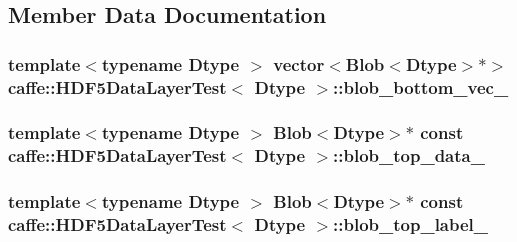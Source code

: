 \subsection{Member Data Documentation}
\hypertarget{classcaffe_1_1_h_d_f5_data_layer_test_a68f3f644d32f341c09cab346701df1e6}{
\subsubsection[{blob\+\_\+bottom\+\_\+vec\+\_\+}]{\setlength{\rightskip}{0pt plus 5cm}template$<$typename Dtype $>$ vector$<${\bf Blob}$<$Dtype$>$$\ast$$>$ {\bf caffe\+::\+H\+D\+F5\+Data\+Layer\+Test}$<$ Dtype $>$\+::blob\+\_\+bottom\+\_\+vec\+\_\+\hspace{0.3cm}{\ttfamily [protected]}}}\label{classcaffe_1_1_h_d_f5_data_layer_test_a68f3f644d32f341c09cab346701df1e6}
\hypertarget{classcaffe_1_1_h_d_f5_data_layer_test_a4e051fd65360f35354b864e33ae74eaa}{
\subsubsection[{blob\+\_\+top\+\_\+data\+\_\+}]{\setlength{\rightskip}{0pt plus 5cm}template$<$typename Dtype $>$ {\bf Blob}$<$Dtype$>$$\ast$ const {\bf caffe\+::\+H\+D\+F5\+Data\+Layer\+Test}$<$ Dtype $>$\+::blob\+\_\+top\+\_\+data\+\_\+\hspace{0.3cm}{\ttfamily [protected]}}}\label{classcaffe_1_1_h_d_f5_data_layer_test_a4e051fd65360f35354b864e33ae74eaa}
\hypertarget{classcaffe_1_1_h_d_f5_data_layer_test_afb89ea13ccf6f75de384f703c9444174}{
\subsubsection[{blob\+\_\+top\+\_\+label\+\_\+}]{\setlength{\rightskip}{0pt plus 5cm}template$<$typename Dtype $>$ {\bf Blob}$<$Dtype$>$$\ast$ const {\bf caffe\+::\+H\+D\+F5\+Data\+Layer\+Test}$<$ Dtype $>$\+::blob\+\_\+top\+\_\+label\+\_\+\hspace{0.3cm}{\ttfamily [protected]}}}\label{classcaffe_1_1_h_d_f5_data_layer_test_afb89ea13ccf6f75de384f703c9444174}
